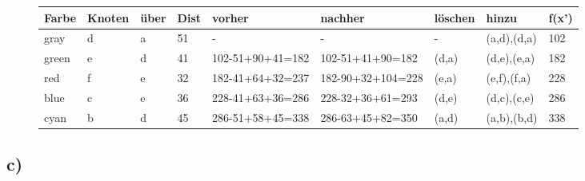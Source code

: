 \documentclass[12pt]{article}
\begin{document}
	\begin{figure}[H]
		\centering
		\begin{tabular}{l | l | l|l|l|l|l|l|l}
			Farbe & Knoten & über & Dist & vorher & nachher &löschen & hinzu & f(x') \\ \hline
			\color{gray}gray & d & a & 51 & - & - & - & (a,d),(d,a) & 102 \\
			\color{green}green & e & d & 41 & 102-51+90+41=182 & 102-51+41+90=182 & (d,a) & (d,e),(e,a) & 182 \\
			\color{red}red & f & e & 32 & 182-41+64+32=237 & 182-90+32+104=228 & (e,a) & (e,f),(f,a) & 228 \\
			\color{blue}blue & c & e & 36 & 228-41+63+36=286 & 228-32+36+61=293 & (d,e) & (d,c),(c,e) & 286 \\
			\color{cyan}cyan & b & d & 45 & 286-51+58+45=338 & 286-63+45+82=350 & (a,d) & (a,b),(b,d) & 338\\
		\end{tabular}
	\end{figure}
		
	\subsection{c)}
	
\end{document}

